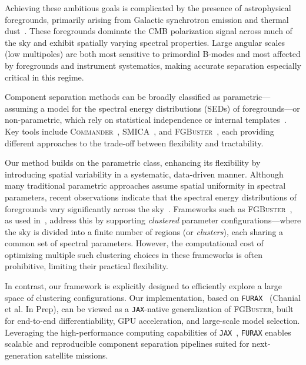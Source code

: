 \documentclass[fleqn,usenatbib]{mnras}
\begin{document}
Achieving these ambitious goals is complicated by the presence of astrophysical foregrounds, primarily arising from Galactic synchrotron emission and thermal dust~\citep{Planck2016SED, MeisnerFinkbeiner2015}. These foregrounds dominate the CMB polarization signal across much of the sky and exhibit spatially varying spectral properties. Large angular scales (low multipoles) are both most sensitive to primordial B-modes and most affected by foregrounds and instrument systematics, making accurate separation especially critical in this regime.

Component separation methods can be broadly classified as parametric---assuming a model for the spectral energy distributions (SEDs) of foregrounds---or non-parametric, which rely on statistical independence or internal templates~\citep{Delabrouille2003, Cardoso2008}. Key tools include \textsc{Commander}~\citep{Eriksen2008, PLANCK}, \textsc{SMICA}~\citep{Cardoso2008, PLANCK}, and \textsc{FGBuster}~\citep{FGBUSTER1, FGBUSTER2}, each providing different approaches to the trade-off between flexibility and tractability.

Our method builds on the parametric class, enhancing its flexibility by introducing spatial variability in a systematic, data-driven manner. Although many traditional parametric approaches assume spatial uniformity in spectral parameters, recent observations indicate that the spectral energy distributions of foregrounds vary significantly across the sky~\citep{PLANCK, MeisnerFinkbeiner2015}. Frameworks such as \textsc{FGBuster}~\citep{FGBUSTER1, FGBUSTER2}, as used in~\citep{LiteBIRD_PTEP_2022}, address this by supporting \textit{clustered} parameter configurations—where the sky is divided into a finite number of regions (or \textit{clusters}), each sharing a common set of spectral parameters. However, the computational cost of optimizing multiple such clustering choices in these frameworks is often prohibitive, limiting their practical flexibility.

In contrast, our framework is explicitly designed to efficiently explore a large space of clustering configurations. Our implementation, based on \texttt{FURAX}~\citep{FURAX} (Chanial et al. In Prep), can be viewed as a \texttt{JAX}-native generalization of \textsc{FGBuster}, built for end-to-end differentiability, GPU acceleration, and large-scale model selection. Leveraging the high-performance computing capabilities of \texttt{JAX}~\citep{JAX}, \texttt{FURAX} enables scalable and reproducible component separation pipelines suited for next-generation satellite missions.
\end{document}
